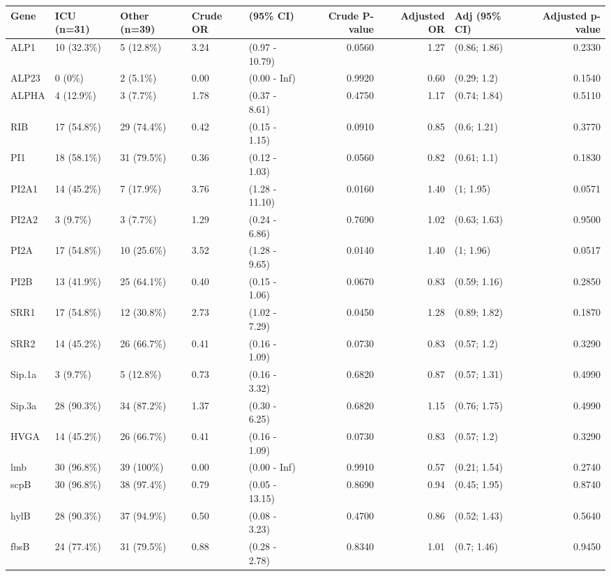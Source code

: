 \begin{table}[ht]
\centering
\begin{tabular}{lllllrrlr}
  \hline
Gene & ICU (n=31) & Other (n=39) & Crude OR & (95\% CI) & Crude P-value & Adjusted OR & Adj (95\% CI) & Adjusted p-value \\ 
  \hline
ALP1 & 10 (32.3\%) & 5 (12.8\%) & 3.24 & (0.97 - 10.79) & 0.0560 & 1.27 & (0.86; 1.86) & 0.2330 \\ 
  ALP23 & 0 (0\%) & 2 (5.1\%) & 0.00 & (0.00 - Inf) & 0.9920 & 0.60 & (0.29; 1.2) & 0.1540 \\ 
  ALPHA & 4 (12.9\%) & 3 (7.7\%) & 1.78 & (0.37 - 8.61) & 0.4750 & 1.17 & (0.74; 1.84) & 0.5110 \\ 
  RIB & 17 (54.8\%) & 29 (74.4\%) & 0.42 & (0.15 - 1.15) & 0.0910 & 0.85 & (0.6; 1.21) & 0.3770 \\ 
  PI1 & 18 (58.1\%) & 31 (79.5\%) & 0.36 & (0.12 - 1.03) & 0.0560 & 0.82 & (0.61; 1.1) & 0.1830 \\ 
  PI2A1 & 14 (45.2\%) & 7 (17.9\%) & 3.76 & (1.28 - 11.10) & 0.0160 & 1.40 & (1; 1.95) & 0.0571 \\ 
  PI2A2 & 3 (9.7\%) & 3 (7.7\%) & 1.29 & (0.24 - 6.86) & 0.7690 & 1.02 & (0.63; 1.63) & 0.9500 \\ 
  PI2A & 17 (54.8\%) & 10 (25.6\%) & 3.52 & (1.28 - 9.65) & 0.0140 & 1.40 & (1; 1.96) & 0.0517 \\ 
  PI2B & 13 (41.9\%) & 25 (64.1\%) & 0.40 & (0.15 - 1.06) & 0.0670 & 0.83 & (0.59; 1.16) & 0.2850 \\ 
  SRR1 & 17 (54.8\%) & 12 (30.8\%) & 2.73 & (1.02 - 7.29) & 0.0450 & 1.28 & (0.89; 1.82) & 0.1870 \\ 
  SRR2 & 14 (45.2\%) & 26 (66.7\%) & 0.41 & (0.16 - 1.09) & 0.0730 & 0.83 & (0.57; 1.2) & 0.3290 \\ 
  Sip.1a & 3 (9.7\%) & 5 (12.8\%) & 0.73 & (0.16 - 3.32) & 0.6820 & 0.87 & (0.57; 1.31) & 0.4990 \\ 
  Sip.3a & 28 (90.3\%) & 34 (87.2\%) & 1.37 & (0.30 - 6.25) & 0.6820 & 1.15 & (0.76; 1.75) & 0.4990 \\ 
  HVGA & 14 (45.2\%) & 26 (66.7\%) & 0.41 & (0.16 - 1.09) & 0.0730 & 0.83 & (0.57; 1.2) & 0.3290 \\ 
  lmb & 30 (96.8\%) & 39 (100\%) & 0.00 & (0.00 - Inf) & 0.9910 & 0.57 & (0.21; 1.54) & 0.2740 \\ 
  scpB & 30 (96.8\%) & 38 (97.4\%) & 0.79 & (0.05 - 13.15) & 0.8690 & 0.94 & (0.45; 1.95) & 0.8740 \\ 
  hylB & 28 (90.3\%) & 37 (94.9\%) & 0.50 & (0.08 - 3.23) & 0.4700 & 0.86 & (0.52; 1.43) & 0.5640 \\ 
  fbsB & 24 (77.4\%) & 31 (79.5\%) & 0.88 & (0.28 - 2.78) & 0.8340 & 1.01 & (0.7; 1.46) & 0.9450 \\ 
   \hline
\end{tabular}
\end{table}
